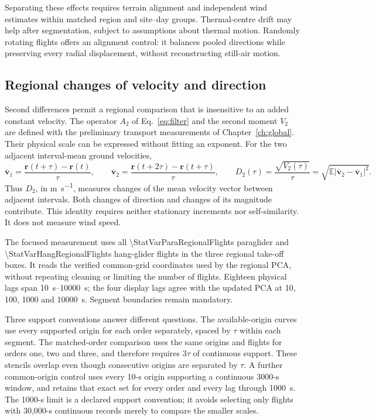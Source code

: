 Separating these effects requires terrain alignment and independent wind estimates
within matched region and site--day groups. Thermal-centre drift may help after
segmentation, subject to assumptions about thermal motion. Randomly rotating flights
offers an alignment control: it balances pooled directions while preserving every
radial displacement, without reconstructing still-air motion.

\FloatBarrier
\subsection{Regional changes of velocity and direction}
\label{sec:regional-variations}

Second differences permit a regional comparison that is insensitive to an added
constant velocity. The operator $A_2$ of Eq.~\eqref{eq:filter} and the second moment
$V_2$ are defined with the preliminary transport measurements of
Chapter~\ref{ch:global}. Their physical scale can be expressed without fitting an exponent.
For the two adjacent interval-mean ground velocities,
\begin{equation}
 \overline{\mathbf v}_1=\frac{\mathbf r(t+\tau)-\mathbf r(t)}{\tau},\qquad
 \overline{\mathbf v}_2=\frac{\mathbf r(t+2\tau)-\mathbf r(t+\tau)}{\tau},\qquad
 D_2(\tau)=\frac{\sqrt{V_2(\tau)}}{\tau}
 =\sqrt{\mathbb E|\overline{\mathbf v}_2-\overline{\mathbf v}_1|^2}.
 \label{eq:variation-velocity-change}
\end{equation}
Thus $D_2$, in \si{\metre\per\second}, measures changes of the mean velocity vector
between adjacent intervals. Both changes of direction and changes of its magnitude
contribute. This identity requires neither stationary increments nor self-similarity.
It does not measure wind speed.

The focused measurement uses all \num{\StatVarParaRegionalFlights} paraglider and
\num{\StatVarHangRegionalFlights} hang-glider flights in the three regional take-off
boxes. It reads the verified common-grid coordinates used by the regional PCA,
without repeating cleaning or limiting the number of flights. Eighteen physical
lags span \SIrange{10}{10000}{\second}; the four display lags agree with the updated
PCA at 10, 100, 1000 and \SI{10000}{\second}. Segment boundaries remain mandatory.

Three support conventions answer different questions. The available-origin curves
use every supported origin for each order separately, spaced by $\tau$ within each
segment. The matched-order comparison uses the same origins and flights for orders
one, two and three, and therefore requires $3\tau$ of continuous support. These
stencils overlap even though consecutive origins are separated by $\tau$. A further
common-origin control uses every 10-s origin supporting a continuous 3000-s window,
and retains that exact set for every order and every lag through \SI{1000}{\second}.
The 1000-s limit is a declared support convention; it avoids selecting only flights
with 30,000-s continuous records merely to compare the smaller scales.

